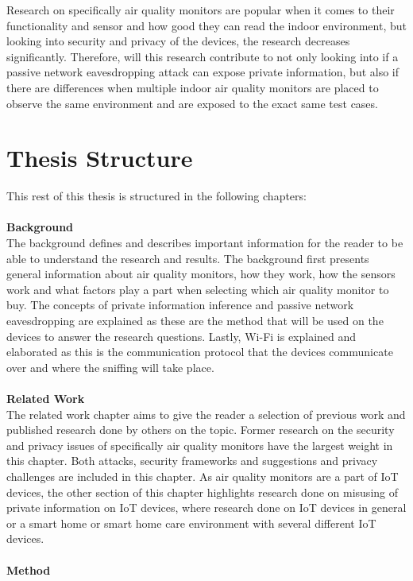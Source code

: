 Research on specifically air quality monitors are popular when it comes to their functionality and sensor and how good they can read the indoor environment, but looking into security and privacy of the devices, the research decreases significantly. Therefore, will this research contribute to not only looking into if a passive network eavesdropping attack can expose private information, but also if there are differences when multiple indoor air quality monitors are placed to observe the same environment and are exposed to the exact same test cases. 

\section{Thesis Structure}
This rest of this thesis is structured in the following chapters:\\\\
\textbf{Background}
\\
The background defines and describes important information for the reader to be able to understand the research and results. The background first presents general information about air quality monitors, how they work, how the sensors work and what factors play a part when selecting which air quality monitor to buy. The concepts of private information inference and passive network eavesdropping are explained as these are the method that will be used on the devices to answer the research questions. Lastly, \gls{Wi-Fi} is explained and elaborated as this is the communication protocol that the devices communicate over and where the sniffing will take place. 
\\\\
\textbf{Related Work}
\\
The related work chapter aims to give the reader a selection of previous work and published research done by others on the topic. Former research on the security and privacy issues of specifically air quality monitors have the largest weight in this chapter. Both attacks, security frameworks and suggestions and privacy challenges are included in this chapter. As air quality monitors are a part of \gls{IoT} devices, the other section of this chapter highlights research done on misusing of private information on \gls{IoT} devices, where research done on \gls{IoT} devices in general or a smart home or smart home care environment with several different \gls{IoT} devices. 
\\\\
\textbf{Method}
\\

